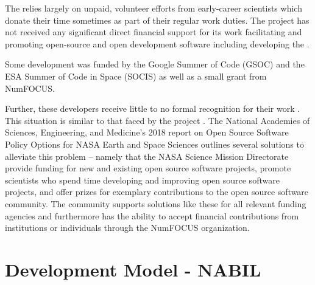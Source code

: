 The \sunpyproj relies largely on unpaid, volunteer efforts from early-career scientists which donate their time sometimes as part of their regular work duties.
The \sunpy project has not received any significant direct financial support for its work facilitating and promoting open-source and open development software including developing the \sunpypkg. 

Some development was funded by the Google Summer of Code (GSOC) and the ESA Summer of Code in Space (SOCIS) as well as a small grant from NumFOCUS. 

Further, these developers receive little to no formal recognition for their work \citep{Muna2016}. 
This situation is similar to that faced by the \astropy project \citep{PriceWhelan:2018ji}. 
The National Academies of Sciences, Engineering, and Medicine's 2018 report on Open Source Software Policy Options for NASA Earth and Space Sciences \citep{NAP2018} outlines several solutions to alleviate this problem -- namely that the NASA Science Mission Directorate provide funding for new and existing open source software projects, promote scientists who spend time developing and improving open source software projects, and offer prizes for exemplary contributions to the open source software community. 
The \sunpy community supports solutions like these for all relevant funding agencies and furthermore has the ability to accept financial contributions from institutions or individuals through the NumFOCUS organization.

\section{Development Model - NABIL}

